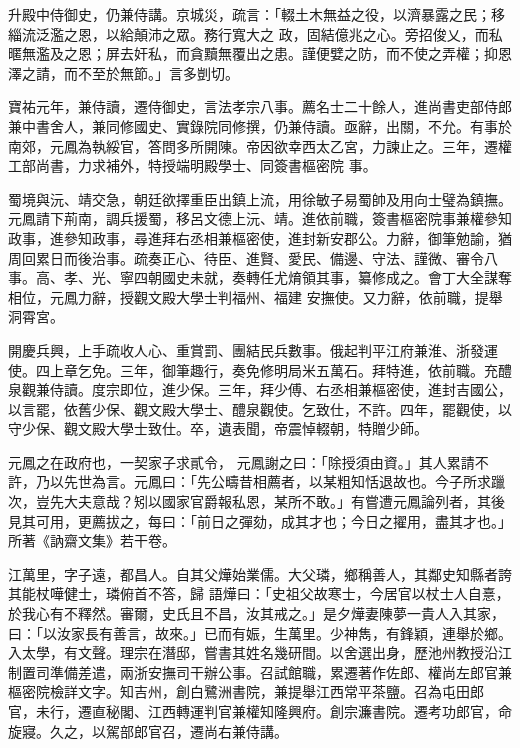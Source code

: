 \begin{pinyinscope}
 升殿中侍御史，仍兼侍講。京城災，疏言：「輟土木無益之役，以濟暴露之民；移緇流泛濫之恩，以給顛沛之眾。務行寬大之
 政，固結億兆之心。旁招俊乂，而私暱無濫及之恩；屏去奸私，而貪黷無覆出之患。謹便嬖之防，而不使之弄權；抑恩澤之請，而不至於無節。」言多剴切。



 寶祐元年，兼侍讀，遷侍御史，言法孝宗八事。薦名士二十餘人，進尚書吏部侍郎兼中書舍人，兼同修國史、實錄院同修撰，仍兼侍讀。亟辭，出關，不允。有事於南郊，元鳳為執綏官，答問多所開陳。帝因欲幸西太乙宮，力諫止之。三年，遷權工部尚書，力求補外，特授端明殿學士、同簽書樞密院
 事。



 蜀境與沅、靖交急，朝廷欲擇重臣出鎮上流，用徐敏子易蜀帥及用向士璧為鎮撫。元鳳請下荊南，調兵援蜀，移呂文德上沅、靖。進依前職，簽書樞密院事兼權參知政事，進參知政事，尋進拜右丞相兼樞密使，進封新安郡公。力辭，御筆勉諭，猶周回累日而後治事。疏奏正心、待臣、進賢、愛民、備邊、守法、謹微、審令八事。高、孝、光、寧四朝國史未就，奏轉任尤焴領其事，纂修成之。會丁大全謀奪相位，元鳳力辭，授觀文殿大學士判福州、福建
 安撫使。又力辭，依前職，提舉洞霄宮。



 開慶兵興，上手疏收人心、重賞罰、團結民兵數事。俄起判平江府兼淮、浙發運使。四上章乞免。三年，御筆趣行，奏免修明局米五萬石。拜特進，依前職。充醴泉觀兼侍讀。度宗即位，進少保。三年，拜少傅、右丞相兼樞密使，進封吉國公，以言罷，依舊少保、觀文殿大學士、醴泉觀使。乞致仕，不許。四年，罷觀使，以守少保、觀文殿大學士致仕。卒，遺表聞，帝震悼輟朝，特贈少師。



 元鳳之在政府也，一契家子求貳令，
 元鳳謝之曰：「除授須由資。」其人累請不許，乃以先世為言。元鳳曰：「先公疇昔相薦者，以某粗知恬退故也。今子所求躐次，豈先大夫意哉？矧以國家官爵報私恩，某所不敢。」有嘗遭元鳳論列者，其後見其可用，更薦拔之，每曰：「前日之彈劾，成其才也；今日之擢用，盡其才也。」所著《訥齋文集》若干卷。



 江萬里，字子遠，都昌人。自其父燁始業儒。大父璘，鄉稱善人，其鄰史知縣者誇其能杖嘩健士，璘俯首不答，歸
 語燁曰：「史祖父故寒士，今居官以杖士人自憙，於我心有不釋然。審爾，史氏且不昌，汝其戒之。」是夕燁妻陳夢一貴人入其家，曰：「以汝家長有善言，故來。」已而有娠，生萬里。少神雋，有鋒穎，連舉於鄉。入太學，有文聲。理宗在潛邸，嘗書其姓名幾研間。以舍選出身，歷池州教授沿江制置司準備差遣，兩浙安撫司干辦公事。召試館職，累遷著作佐郎、權尚左郎官兼樞密院檢詳文字。知吉州，創白鷺洲書院，兼提舉江西常平茶鹽。召為屯田郎
 官，未行，遷直秘閣、江西轉運判官兼權知隆興府。創宗濂書院。遷考功郎官，命旋寢。久之，以駕部郎官召，遷尚右兼侍講。




\end{pinyinscope}
